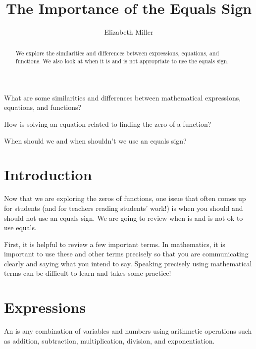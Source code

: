 \documentclass{ximera}
\author{Elizabeth Miller}
\title{The Importance of the Equals Sign}
\begin{document}
\begin{abstract}
 We explore the similarities and differences between expressions, equations, and functions.  We also look at when it is and is not appropriate to use the equals sign.
\end{abstract}
\maketitle



\begin{motivatingQuestions}
\item What are some similarities and differences between mathematical expressions, equations, and functions?
\item How is solving an equation related to finding the zero of a function?
\item When should we and when shouldn't we use an equals sign?
\end{motivatingQuestions}



\section{Introduction}
Now that we are exploring the zeros of functions, one issue that often comes up for students (and for teachers reading students' work!) is when you should and should not use an equals sign.  We are going to review when is and is not ok to use equals.

First, it is helpful to review a few important terms.  In mathematics, it is important to use these and other terms precisely so that you are communicating clearly and saying what you intend to say.  Speaking precisely using mathematical terms can be difficult to learn and takes some practice!

\section{Expressions}

\begin{definition}
An  is any combination of variables and numbers using arithmetic operations such as addition, subtraction, multiplication, division, and exponentiation.
\end{definition}
\end{document}
